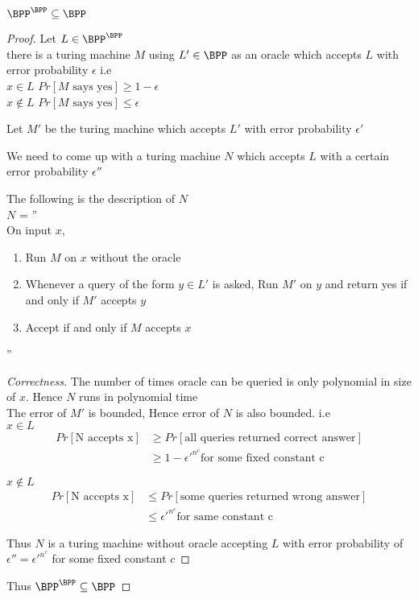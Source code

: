 \begin{claim}\label{oracle_bpp_in_bpp}
    $\BPP^\BPP \subseteq \BPP$
\end{claim}
\begin{proof}
    Let $L \in \BPP^\BPP$\\
    \imp there is a turing machine $M$ using $L' \in \BPP$ as an oracle which accepts $L$ with error probability $\epsilon$ i.e\\
    $x \in L$ \imp $Pr[\text{$M$ says yes}] \ge 1 - \epsilon$\\
    $x \notin L$ \imp $Pr[\text{$M$ says yes}] \le  \epsilon$

    Let $M'$ be the turing machine which accepts $L'$ with error probability $\epsilon'$

    We need to come up with a turing machine $N$ which accepts $L$ with a certain error probability $\epsilon''$

    The following is the description of $N$\\
    $N$ = ''\\
    On input $x$,
    \begin{enumerate}
        \item Run $M$ on $x$ without the oracle
        \item Whenever a query of the form $y \in L'$ is asked, Run $M'$ on $y$ and return yes if and only if $M'$ accepts $y$
        \item Accept if and only if $M$ accepts $x$
    \end{enumerate}

    ''

    \begin{proof}
        [Correctness]
        The number of times oracle can be queried is only polynomial in size of $x$. Hence $N$ runs in polynomial time\\
        The error of $M'$ is bounded, Hence error of $N$ is also bounded.
        i.e\\
        $x \in L$ \\
        \imp
        \begin{align}
              Pr[\text{N accepts x}] &\ge Pr[\text{all queries returned correct answer}]\\
              &\ge 1 - \epsilon'^{n^c} \text{for some fixed constant c}
        \end{align}

         $x \notin L$ \\
        \imp
        \begin{align}
              Pr[\text{N accepts x}] &\le Pr[\text{some queries returned wrong answer}]\\
              &\le \epsilon'^{n^c} \text{for same  constant c}
        \end{align}

      Thus $N$ is a turing machine without oracle accepting $L$ with error probability of $\epsilon'' = \epsilon'^{n^c}$ for some fixed constant $c$
    \end{proof}
    
    Thus $\BPP^\BPP \subseteq \BPP$
\end{proof}







